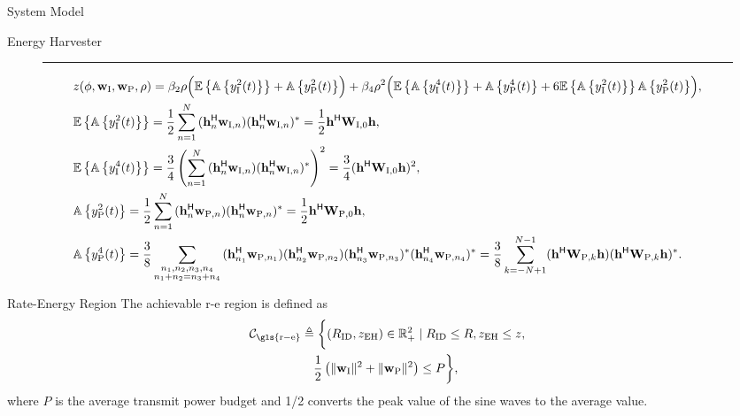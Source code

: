 \begin{section}{System Model}
\begin{subsection}{Energy Harvester}
		\begin{figure*}[!b]
			\hrule
			\begin{align}
				&z(\mathbf{\phi},\mathbf{w}_{\mathrm{I}},\mathbf{w}_{\mathrm{P}},\rho) = \beta_2\rho\Bigl(\mathbb{E}\left\{\mathbb{A}\left\{y_{\mathrm{I}}^2(t)\right\}\right\}+\mathbb{A}\left\{y_{\mathrm{P}}^2(t)\right\}\Bigr)+\beta_4\rho^2\Bigl(\mathbb{E}\left\{\mathbb{A}\left\{y_{\mathrm{I}}^4(t)\right\}\right\}+\mathbb{A}\left\{y_{\mathrm{P}}^4(t)\right\}+6\mathbb{E}\left\{\mathbb{A}\left\{y_{\mathrm{I}}^2(t)\right\}\right\}\mathbb{A}\left\{y_{\mathrm{P}}^2(t)\right\}\Bigr),\label{eq:z_expand}\\
				&\mathbb{E}\left\{\mathbb{A}\left\{y_{\mathrm{I}}^2(t)\right\}\right\} = \frac{1}{2}\sum_{n=1}^N{(\mathbf{h}_{n}^\mathsf{H}\mathbf{w}_{\mathrm{I},n})(\mathbf{h}_{n}^\mathsf{H}\mathbf{w}_{\mathrm{I},n})^*} = \frac{1}{2}\mathbf{h}^\mathsf{H}\mathbf{W}_{\mathrm{I},0}\mathbf{h},\label{eq:y_I2}\\
				&\mathbb{E}\left\{\mathbb{A}\left\{y_{\mathrm{I}}^4(t)\right\}\right\} = \frac{3}{4}\left(\sum_{n=1}^N{(\mathbf{h}_{n}^\mathsf{H}\mathbf{w}_{\mathrm{I},n})(\mathbf{h}_{n}^\mathsf{H}\mathbf{w}_{\mathrm{I},n})^*}\right)^2 = \frac{3}{4}(\mathbf{h}^\mathsf{H}\mathbf{W}_{\mathrm{I},0}\mathbf{h})^2,\label{eq:y_I4}\\
				&\mathbb{A}\left\{y_{\mathrm{P}}^2(t)\right\} = \frac{1}{2}\sum_{n=1}^N{(\mathbf{h}_{n}^\mathsf{H}\mathbf{w}_{\mathrm{P},n})(\mathbf{h}_{n}^\mathsf{H}\mathbf{w}_{\mathrm{P},n})^*} = \frac{1}{2}\mathbf{h}^\mathsf{H}\mathbf{W}_{\mathrm{P},0}\mathbf{h},\label{eq:y_P2}\\
				&\mathbb{A}\left\{y_{\mathrm{P}}^4(t)\right\} = \frac{3}{8}\sum_{\substack{{n_1},{n_2},{n_3},{n_4}\\{n_1}+{n_2}={n_3}+{n_4}}}{(\mathbf{h}_{{n_1}}^\mathsf{H}\mathbf{w}_{\mathrm{P},{n_1}})(\mathbf{h}_{{n_2}}^\mathsf{H}\mathbf{w}_{\mathrm{P},{n_2}})(\mathbf{h}_{{n_3}}^\mathsf{H}\mathbf{w}_{\mathrm{P},{n_3}})^*(\mathbf{h}_{{n_4}}^\mathsf{H}\mathbf{w}_{\mathrm{P},{n_4}})^*} = \frac{3}{8}\sum_{k=-N+1}^{N-1}(\mathbf{h}^\mathsf{H}\mathbf{W}_{\mathrm{P},k}\mathbf{h})(\mathbf{h}^\mathsf{H}\mathbf{W}_{\mathrm{P},k}\mathbf{h})^*.\label{eq:y_P4}
			\end{align}
		\end{figure*}
	\end{subsection}


	\begin{subsection}{Rate-Energy Region}
		The achievable \gls{r-e} region is defined as
		\begin{align}
			\mathcal{C}_{\mathrm{\gls{r-e}}}
			&\triangleq \biggl\{(R_{\mathrm{ID}}, z_{\mathrm{EH}}) \in \mathbb{R}_+^2 \mid R_{\mathrm{ID}} \le R, z_{\mathrm{EH}} \le z,\nonumber\\
			&\quad \frac{1}{2}\left(\lVert{\mathbf{w}_{\mathrm{I}}}\rVert^2+\lVert{\mathbf{w}_{\mathrm{P}}}\rVert^2\right) \le P\biggr\},
		\end{align}
		where $P$ is the average transmit power budget and 1/2 converts the peak value of the sine waves to the average value.
	\end{subsection}
\end{section}


